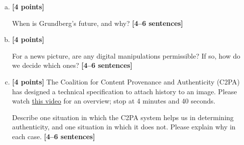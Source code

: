 \documentclass[11pt]{article}
\begin{document}
\begin{enumerate}[(a)]
\item \textbf{[4 points]}
    \begin{tcolorbox}[colback=orange!5!white,colframe=orange!75!black]
        When is Grundberg's future, and why? \textbf{[4--6 sentences]}
    \end{tcolorbox}

\item \textbf{[4 points]}
    \begin{tcolorbox}[colback=orange!5!white,colframe=orange!75!black]
        For a news picture, are any digital manipulations permissible? If so, how do we decide which ones? \textbf{[4--6 sentences]}
    \end{tcolorbox}
    
\pagebreak
\item \textbf{[4 points]}
    The Coalition for Content Provenance and Authenticity (C2PA) has designed a technical specification to attach history to an image. Please watch \href{https://www.youtube.com/watch?v=hA0ZjqakEF8}{this video} for an overview; stop at 4 minutes and 40 seconds.
    \begin{tcolorbox}[colback=orange!5!white,colframe=orange!75!black]
        Describe one situation in which the C2PA system helps us in determining authenticity, and one situation in which it does not. Please explain why in each case. \textbf{[4--6 sentences]}
    \end{tcolorbox}
\end{enumerate}
\end{document}
